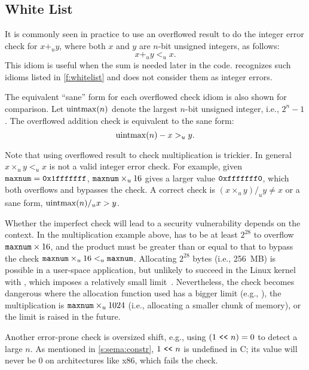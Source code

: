 \subsection{White List}
\label{s:sema:whitelist}

It is commonly seen in practice to use an overflowed result to do
the integer error check for $x +_u y$, where both $x$ and $y$ are
$n$-bit unsigned integers, as follows:
\begin{equation*}
x +_u y <_u x.
\end{equation*}
This idiom is useful when the sum is needed later in the code.
\sys recognizes such idioms listed in \autoref{f:whitelist} and
does not consider them as integer errors.

The equivalent ``sane'' form for each overflowed check idiom is
also shown for comparison.  Let $\operatorname{uintmax}(n)$ denote the largest
$n$-bit unsigned integer, i.e., $2^n - 1$.  The overflowed addition
check is equivalent to the sane form:
\begin{equation*}
\operatorname{uintmax}(n) - x >_u y.
\end{equation*}

Note that using overflowed result to check multiplication is trickier.
In general $x \times_u y <_u x$ is not a valid integer error check.
For example, given $\texttt{maxnum} = \texttt{0x1fffffff}$, $\texttt{maxnum}
\times_u 16$ gives a larger value $\texttt{0xfffffff0}$, which both
overflows and bypasses the check.  A correct check is $(x \times_u
y) /_u y \neq x$ or a sane form, $\operatorname{uintmax}(n) /_u x > y$.

Whether the imperfect check will lead to a security vulnerability
depends on the context.  In the multiplication example above,
 has to be at least $2^{28}$ to overflow $\texttt{maxnum}
\times 16$, and the product must be greater than or equal to that
to bypass the check $\texttt{maxnum} \times_u 16 <_u \texttt{maxnum}$.
Allocating $2^{28}$ bytes (i.e., 256~MB) is possible in a user-space
application, but unlikely to succeed in the Linux kernel with
, which imposes a relatively small
limit~\cite[\chapterautorefname~8]{ldd3}.  Nevertheless, the check
becomes dangerous where the allocation function used has a bigger
limit (e.g., ), the multiplication is $\texttt{maxnum}
\times_u 1024$ (i.e., allocating a smaller chunk of memory), or the
 limit is raised in the future.

Another error-prone check is oversized shift, e.g., using $(1 \ \texttt{<}\texttt{<}\ 
n) = 0$ to detect a large $n$.  As mentioned in \autoref{s:sema:constr},
${1 \ \texttt{<}\texttt{<}\  n}$ is undefined in C; its value will never be 0 on
architectures like x86, which fails the check.


